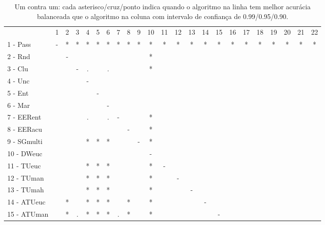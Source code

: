 \begin{table}[h]
\caption{Um contra um: cada asterisco/cruz/ponto indica quando o algoritmo na linha tem melhor acurácia balanceada que o algoritmo na coluna com intervalo de confiança de 0.99/0.95/0.90.}
\begin{center}
\begin{tabular}{lcc|cc|cc|cc|cc|cc|cc|cc|cc|cc|cc}
 			& 1 & 2 & 3 & 4 & 5 & 6 & 7 & 8 & 9 & 10 & 11 & 12 & 13 & 14 & 15 & 16 & 17 & 18 & 19 & 20 & 21 & 22\\
1 - Pass 	& - & * & * & * & * & * & * & * & * & * & * & * & * & * & * & * & * & * & * & * & * & * \\
2 - Rnd  	&   & - &   &   &   &   &   &   &   & * &   &   &   &   &   &   &   &   &   &   &   &   \\ \hline
3 - Clu  	&   &   & - & . &   & . &   &   &   & * &   &   &   &   &   &   &   &   &   &   &   &   \\
4 - Unc  	&   &   &   & - &   &   &   &   &   &   &   &   &   &   &   &   &   &   &   &   &   &   \\ \hline
5 - Ent  	&   &   &   &   & - &   &   &   &   &   &   &   &   &   &   &   &   &   &   &   &   &   \\
6 - Mar  	&   &   &   &   &   & - &   &   &   &   &   &   &   &   &   &   &   &   &   &   &   &   \\ \hline
7 - EERent	&   &   &   & . &   & . & - &   &   & * &   &   &   &   &   &   &   &   &   &   &   &   \\
8 - EERacu	&   &   &   &   &   &   &   & - &   & * &   &   &   &   &   &   &   &   &   &   &   &   \\ \hline
9 - SGmulti	&   &   &   & * & * & * &   &   & - & * &   &   &   &   &   &   &   &   &   &   &   &   \\
10 - DWeuc	&   &   &   &   &   &   &   &   &   & - &   &   &   &   &   &   &   &   &   &   &   &   \\ \hline
11 - TUeuc	&   &   &   & * & * & * &   &   &   & * & - &   &   &   &   &   &   &   &   &   &   &   \\
12 - TUman	&   &   &   & * & * & * &   &   &   & * &   & - &   &   &   &   &   &   &   &   &   &   \\ \hline
13 - TUmah	&   &   &   & * & * & * &   &   &   & * &   &   & - &   &   &   &   &   &   &   &   &   \\
14 - ATUeuc	&   & * &   & * & * & * &   & * &   & * &   &   &   & - &   &   &   &   &   &   &   &   \\ \hline
15 - ATUman	&   & * & . & * & * & * & . & * &   & * &   &   &   &   & - &   &   &   &   &   &   &   \\

\end{tabular}
\end{center}
\end{table}
